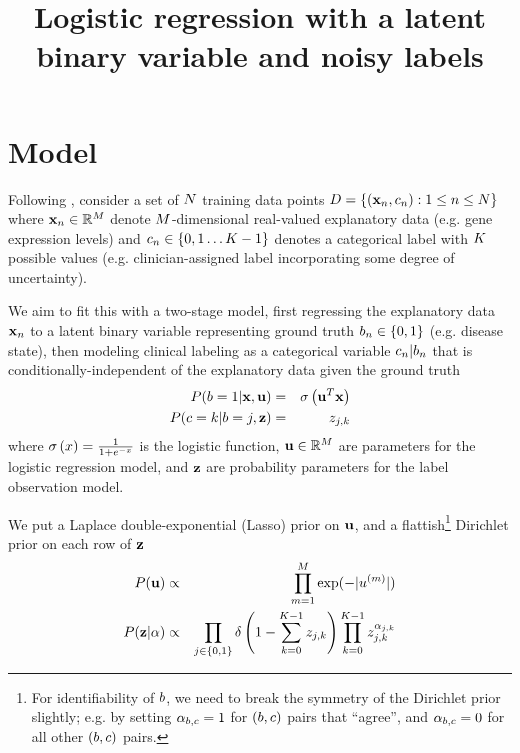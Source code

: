 \documentclass{article}
\begin{document}

\title{Logistic regression with a latent binary variable and noisy labels}

\maketitle

\section{Model}

Following \cite{BootkrajangKaban2012},
consider a set of $N$ training data points
$D = \left\{ ({\bf x}_{n},c_{n}): 1 \leq n \leq N \right\}$
where
${\bf x}_n \in \mathbb{R}^M$
denote $M$-dimensional real-valued explanatory data (e.g. gene expression levels)
and
$c_n \in \left\{ 0, 1 \ldots K - 1 \right\}$
denotes a categorical label with $K$ possible values
(e.g. clinician-assigned label incorporating some degree of uncertainty).

We aim to fit this with a two-stage model,
first regressing the explanatory data ${\bf x}_n$ to a latent binary variable representing ground truth
$b_n \in \left\{ 0, 1 \right\}$
(e.g. disease state),
then modeling clinical labeling as a categorical variable $c_n | b_n$
that is conditionally-independent of the explanatory data given the ground truth
\begin{eqnarray*}
P(b = 1 | {\bf x}, {\bf u}) & = & \sigma\left({\bf u}^T {\bf x}\right) \\
P(c = k | b = j, {\bf z}) & = & z_{j,k}
\end{eqnarray*}
where
$\sigma\left(x\right) = \frac{1}{1+e^{-x}}$ is the logistic function,
${\bf u} \in \mathbb{R}^M$ are parameters for the logistic regression model, and
${\bf z}$ are probability parameters for the label observation model.

We put a Laplace double-exponential (Lasso) prior on ${\bf u}$, and a flattish\footnote{
  For identifiability of $b$, we need to break the symmetry of the Dirichlet prior slightly;
  e.g. by setting $\alpha_{b,c} = 1$ for $(b,c)$ pairs that ``agree'',
  and $\alpha_{b,c} = 0$ for all other $(b,c)$ pairs.
} Dirichlet prior on each row of ${\bf z}$
\begin{eqnarray*}
P({\bf u}) & \propto & \prod_{m=1}^{M} \exp(-|u^{(m)}|) \\
P({\bf z}|\alpha) & \propto & \prod_{j \in \{0,1\}} \delta \left( 1 - \sum_{k=0}^{K-1} z_{j,k} \right)
\prod_{k=0}^{K-1} z_{j,k}^{\alpha_{j,k}}
\end{eqnarray*}
\end{document}
